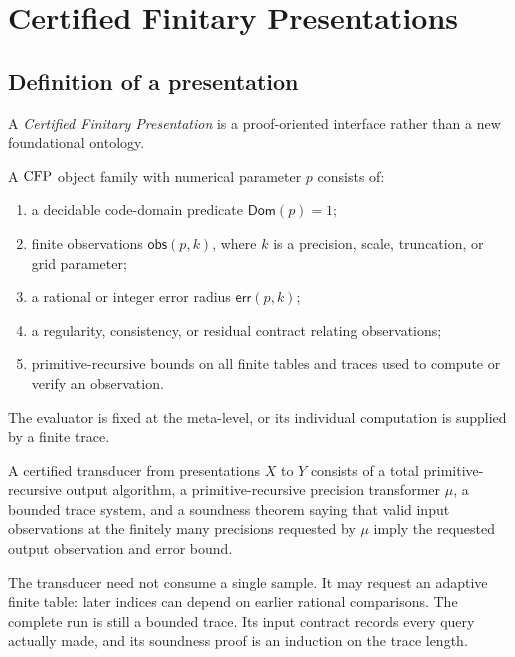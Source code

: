 \section{Certified Finitary Presentations}
\label{sec:framework}

\subsection{Definition of a presentation}

A \emph{Certified Finitary Presentation} is a proof-oriented interface rather
than a new foundational ontology.

\begin{definition}
A \(\mathrm{CFP}\) object family with numerical parameter \(p\) consists of:
\begin{enumerate}
\item a decidable code-domain predicate \(\mathsf{Dom}(p)=1\);
\item finite observations \(\mathsf{obs}(p,k)\), where \(k\) is a precision,
      scale, truncation, or grid parameter;
\item a rational or integer error radius \(\mathsf{err}(p,k)\);
\item a regularity, consistency, or residual contract relating observations;
\item primitive-recursive bounds on all finite tables and traces used to
      compute or verify an observation.
\end{enumerate}
The evaluator is fixed at the meta-level, or its individual computation is
supplied by a finite trace.
\end{definition}

\begin{definition}
A certified transducer from presentations \(X\) to \(Y\) consists of a total
primitive-recursive output algorithm, a primitive-recursive precision
transformer \(\mu\), a bounded trace system, and a soundness theorem saying
that valid input observations at the finitely many precisions requested by
\(\mu\) imply the requested output observation and error bound.
\end{definition}

The transducer need not consume a single sample.  It may request an adaptive
finite table: later indices can depend on earlier rational comparisons.  The
complete run is still a bounded trace.  Its input contract records every query
actually made, and its soundness proof is an induction on the trace length.

